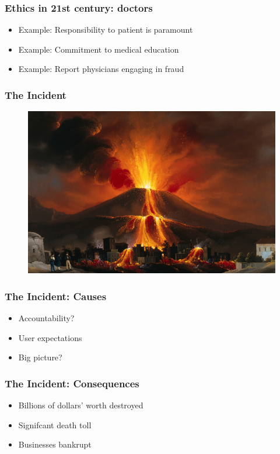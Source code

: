 \begin{frame}[fragile]
\frametitle{Ethics in 21st century: doctors}

\begin{itemize}
\item Example: Responsibility to patient is paramount
\item Example: Commitment to medical education
\item Example: Report physicians engaging in fraud
\end{itemize}

\end{frame}

\begin{frame}[fragile]
\frametitle{The Incident}

\begin{figure}
\includegraphics[scale=0.1]{volcano}
\end{figure}

\end{frame}

\begin{frame}[fragile]
\frametitle{The Incident: Causes}

\begin{itemize}
\item Accountability?
\item User expectations
\item Big picture?
\end{itemize}

\end{frame}

\begin{frame}[fragile]
\frametitle{The Incident: Consequences}

\begin{itemize}
\item Billions of dollars' worth destroyed
\item Signifcant death toll
\item Businesses bankrupt
\end{itemize}

\end{frame}

